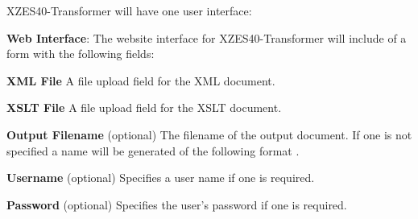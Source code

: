 XZES40-Transformer will have one user interface:

    \textbf{Web Interface}:
    The website interface for XZES40-Transformer will include of a form with the following fields:
    \begin{description}
      \item {
        \textbf{XML File} A file upload field for the XML document.
      }
      \item {
        \textbf{XSLT File} A file upload field for the XSLT document.
      }
      \item {
        \textbf{Output Filename} (optional)
        The filename of the output document.
        If one is not specified a name will be generated of the following format .
      }
      \item {
        \textbf{Username} (optional)
        Specifies a user name if one is required.
      }
      \item {
        \textbf{Password} (optional)
        Specifies the user's password if one is required.
      }
    \end{description}

